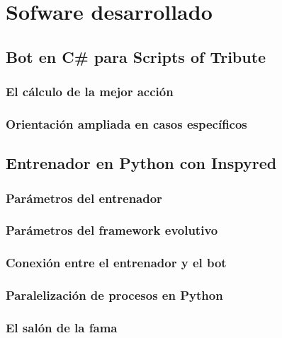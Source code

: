 \chapter{Sofware desarrollado}


\section{Bot en C\# para Scripts of Tribute}

\subsection{El cálculo de la mejor acción}

\subsection{Orientación ampliada en casos específicos}

\section{Entrenador en Python con Inspyred}


\subsection{Parámetros del entrenador}

\subsection{Parámetros del framework evolutivo}

\subsection{Conexión entre el entrenador y el bot}

\subsection{Paralelización de procesos en Python}

\subsection{El salón de la fama}